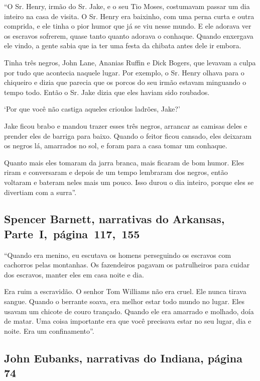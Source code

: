 ``O Sr. Henry, irmão do Sr. Jake, e o seu Tio Moses, costumavam passar
um dia inteiro na casa de visita. O Sr. Henry era baixinho, com uma
perna curta e outra comprida, e ele tinha o pior humor que já se viu
nesse mundo. E ele adorava ver os escravos sofrerem, quase tanto quanto
adorava o conhaque. Quando enxergava ele vindo, a gente sabia que ia ter
uma festa da chibata antes dele ir embora.

Tinha três negros, John Lane, Ananias Ruffin e Dick Bogers, que levavam
a culpa por tudo que acontecia naquele lugar. Por exemplo, o Sr. Henry
olhava para o chiqueiro e dizia que parecia que os porcos do seu irmão
estavam minguando o tempo todo. Então o Sr. Jake dizia que eles haviam
sido roubados.

`Por que você não castiga aqueles crioulos ladrões, Jake?'

Jake ficou brabo e mandou trazer esses três negros, arrancar as camisas
deles e prender eles de barriga para baixo. Quando o feitor ficou
cansado, eles deixaram os negros lá, amarrados no sol, e foram para a
casa tomar um conhaque.

Quanto mais eles tomaram da jarra branca, mais ficaram de bom humor.
Eles riram e conversaram e depois de um tempo lembraram dos negros,
então voltaram e bateram neles mais um pouco. Isso durou o dia inteiro,
porque eles se divertiam com a surra''.

\subsection{Spencer Barnett, narrativas do Arkansas, Parte~I,~página~117,~155} \label{ref18}

``Quando era menino, eu escutava os homens perseguindo os escravos com
cachorros pelas montanhas. Os fazendeiros pagavam os patrulheiros para
cuidar dos escravos, manter eles em casa noite e dia.

Era ruim a escravidão. O senhor Tom Williams não era cruel. Ele
nunca tirava sangue. Quando o berrante soava, era melhor estar todo
mundo no lugar. Eles usavam um chicote de couro trançado. Quando ele era
amarrado e molhado, doía de matar. Uma coisa importante era que você
precisava estar no seu lugar, dia e noite. Era um confinamento''.

\subsection{John Eubanks, narrativas do Indiana, página 74} \label{ref84}

